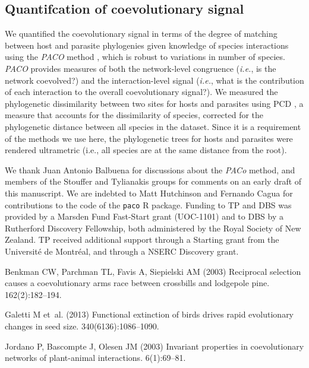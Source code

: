 \documentclass{pnastwo}
\begin{document}
\begin{article}
\begin{materials}
\section{Quantifcation of coevolutionary signal} We quantified the coevolutionary signal in terms of the degree of
matching between host and parasite phylogenies given knowledge of
species interactions using the \emph{PACO} method \cite{balb13}, which
is robust to variations in number of species. \emph{PACO} provides
measures of both the network-level congruence (\emph{i.e.}, is the
network coevolved?) and the interaction-level signal (\emph{i.e.}, what
is the contribution of each interaction to the overall coevolutionary
signal?). We measured the phylogenetic dissimilarity between two sites
for hosts and parasites using PCD \cite{ives10}, a measure that
accounts for the dissimilarity of species, corrected for the
phylogenetic distance between all species in the dataset. Since it is a
requirement of the methods we use here, the phylogenetic trees for hosts
and parasites were rendered ultrametric (i.e., all species are at the
same distance from the root).
\end{materials}


\begin{acknowledgments}
We thank Juan Antonio Balbuena for
discussions about the \emph{PACo} method, and members of the Stouffer
and Tylianakis groups for comments on an early draft of this manuscript.
We are indebted to Matt Hutchinson and Fernando Cagua for contributions
to the code of the \texttt{paco} R package. Funding to TP and DBS was
provided by a Marsden Fund Fast-Start grant (UOC-1101) and to DBS by a
Rutherford Discovery Fellowship, both administered by the Royal Society
of New Zealand. TP received additional support through a Starting grant from the 
Universit\'e de Montr\'eal, and through a NSERC Discovery grant.
\end{acknowledgments}

\begin{thebibliography}{10}

Benkman CW, Parchman TL, Favis A, Siepielski AM (2003) Reciprocal selection
  causes a coevolutionary arms race between crossbills and lodgepole pine.
 162(2):182--194.

Galetti M et~al. (2013) Functional extinction of birds drives rapid
  evolutionary changes in seed size.
 340(6136):1086--1090.

Jordano P, Bascompte J, Olesen JM (2003) Invariant properties in coevolutionary
  networks of plant-animal interactions.
 6(1):69--81.


\end{thebibliography}
\end{article}
\end{document}
